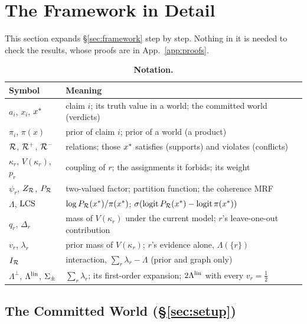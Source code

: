 \section{The Framework in Detail}
\label{app:framework}

This section expands \S\ref{sec:framework} step by step. Nothing in it is needed to check the
results, whose proofs are in App.~\ref{app:proofs}.

\begin{table}[h]
\centering\footnotesize
\setlength{\tabcolsep}{3pt}
\begin{tabularx}{\columnwidth}{@{}l>{\raggedright\arraybackslash}X@{}}
\toprule
Symbol & Meaning \\
\midrule
$a_i$, $x_i$, $x^{\ast}$ & claim $i$; its truth value in a world; the committed world (verdicts) \\
$\pi_i$, $\pi(x)$ & prior of claim $i$; prior of a world (a product) \\
$\mathcal{R}$, $\mathcal{R}^{+}$, $\mathcal{R}^{-}$ & relations; those $x^{\ast}$ satisfies (supports) and violates (conflicts) \\
$\kappa_r$, $V(\kappa_r)$, $p_r$ & coupling of $r$; the assignments it forbids; its weight \\
$\psi_r$, $Z_{\mathcal{R}}$, $P_{\mathcal{R}}$ & two-valued factor; partition function; the coherence MRF \\
$\Lambda$, $\mathrm{LCS}$ & $\log P_{\mathcal{R}}(x^{\ast})/\pi(x^{\ast})$; $\sigma(\operatorname{logit}P_{\mathcal{R}}(x^{\ast})-\operatorname{logit}\pi(x^{\ast}))$ \\
$q_r$, $\Delta_r$ & mass of $V(\kappa_r)$ under the current model; $r$'s leave-one-out contribution \\
$v_r$, $\lambda_r$ & prior mass of $V(\kappa_r)$; $r$'s evidence alone, $\Lambda(\{r\})$ \\
$I_{\mathcal{R}}$ & interaction, $\sum_r\lambda_r-\Lambda$ (prior and graph only) \\
$\Lambda^{\perp}$, $\Lambda^{\mathrm{lin}}$, $\Sigma_{\pm}$ & $\sum_r\lambda_r$; its first-order expansion; $2\Lambda^{\mathrm{lin}}$ with every $v_r=\frac12$ \\
\bottomrule
\end{tabularx}
\caption{\textbf{Notation.}}
\label{tab:notation}
\end{table}

\subsection{The Committed World (\S\ref{sec:setup})}

